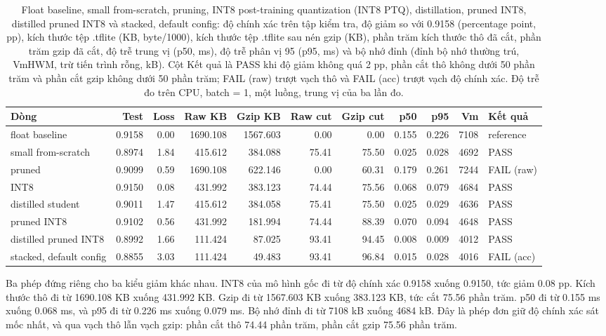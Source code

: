 \documentclass[13pt,a4paper]{article}
\begin{document}
\begin{table}[H]
\centering
\caption{Float baseline, small from-scratch, pruning, INT8 post-training quantization (INT8 PTQ), distillation, pruned INT8, distilled pruned INT8 và stacked, default config: độ chính xác trên tập kiểm tra, độ giảm so với 0.9158 (percentage point, pp), kích thước tệp .tflite (KB, byte/1000), kích thước tệp .tflite sau nén gzip (KB), phần trăm kích thước thô đã cắt, phần trăm gzip đã cắt, độ trễ trung vị (p50, ms), độ trễ phân vị 95 (p95, ms) và bộ nhớ đỉnh (đỉnh bộ nhớ thường trú, VmHWM, trừ tiến trình rỗng, kB). Cột Kết quả là PASS khi độ giảm không quá 2 pp, phần cắt thô không dưới 50 phần trăm và phần cắt gzip không dưới 50 phần trăm; FAIL (raw) trượt vạch thô và FAIL (acc) trượt vạch độ chính xác. Độ trễ đo trên CPU, batch = 1, một luồng, trung vị của ba lần đo.}
\label{tab:results}
\setlength{\tabcolsep}{2.6pt}
\begin{tabular}{|l|r|r|r|r|r|r|r|r|r|l|}
\hline
Dòng & Test & Loss & Raw KB & Gzip KB & Raw cut & Gzip cut & p50 & p95 & Vm & Kết quả \\ \hline
float baseline & 0.9158 & 0.00 & 1690.108 & 1567.603 & 0.00 & 0.00 & 0.155 & 0.226 & 7108 & reference \\ \hline
small from-scratch & 0.8974 & 1.84 & 415.612 & 384.088 & 75.41 & 75.50 & 0.025 & 0.028 & 4692 & PASS \\ \hline
pruned & 0.9099 & 0.59 & 1690.108 & 622.146 & 0.00 & 60.31 & 0.179 & 0.261 & 7244 & FAIL (raw) \\ \hline
INT8 & 0.9150 & 0.08 & 431.992 & 383.123 & 74.44 & 75.56 & 0.068 & 0.079 & 4684 & PASS \\ \hline
distilled student & 0.9011 & 1.47 & 415.612 & 384.058 & 75.41 & 75.50 & 0.025 & 0.029 & 4636 & PASS \\ \hline
pruned INT8 & 0.9102 & 0.56 & 431.992 & 181.994 & 74.44 & 88.39 & 0.070 & 0.094 & 4648 & PASS \\ \hline
distilled pruned INT8 & 0.8992 & 1.66 & 111.424 & 87.025 & 93.41 & 94.45 & 0.008 & 0.009 & 4012 & PASS \\ \hline
stacked, default config & 0.8855 & 3.03 & 111.424 & 49.483 & 93.41 & 96.84 & 0.015 & 0.028 & 4016 & FAIL (acc) \\ \hline
\end{tabular}
\end{table}

Ba phép đứng riêng cho ba kiểu giảm khác nhau.
INT8 của mô hình gốc đi từ độ chính xác 0.9158 xuống 0.9150, tức giảm 0.08 pp.
Kích thước thô đi từ 1690.108 KB xuống 431.992 KB.
Gzip đi từ 1567.603 KB xuống 383.123 KB, tức cắt 75.56 phần trăm.
p50 đi từ 0.155 ms xuống 0.068 ms, và p95 đi từ 0.226 ms xuống 0.079 ms.
Bộ nhớ đỉnh đi từ 7108 kB xuống 4684 kB.
Đây là phép đơn giữ độ chính xác sát mốc nhất, và qua vạch thô lẫn vạch gzip: phần cắt thô 74.44 phần trăm, phần cắt gzip 75.56 phần trăm.
\end{document}
